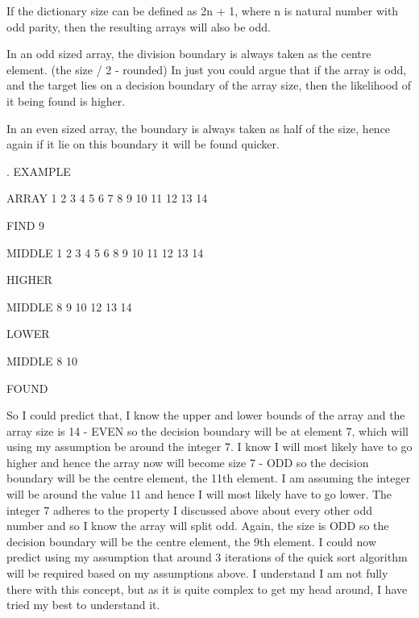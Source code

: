 \documentclass{article}
\begin{document}
If the dictionary size can be defined as 2n + 1, where n is natural number with odd parity, then the resulting arrays will also be odd.\par

In an odd sized array, the division boundary is always taken as the centre element. (the size / 2 - rounded) In just you could argue that if the array is odd, and the target lies on a decision boundary of the array size, then the likelihood of it being found is higher.\par

In an even sized array, the boundary is always taken as half of the size, hence again if it lie on this boundary it will be found quicker.\par

.\newline
EXAMPLE\newline


ARRAY  1 2 3 4 5 6 7 8 9 10 11 12 13 14\newline

FIND   9\newline

MIDDLE 1 2 3 4 5 6   8 9 10 11 12 13 14\newline

HIGHER\newline

MIDDLE               8 9 10    12 13 14\newline

LOWER\newline

MIDDLE               8   10\newline

FOUND\newline


So I could predict that, I know the upper and lower bounds of the array and the array size is 14 - EVEN so the decision boundary will be at element 7, which will using my assumption be around the integer 7.
I know I will most likely have to go higher and hence the array now will become size 7 - ODD so the decision boundary will be the centre element, the 11th element. I am assuming the integer will be around the value 11 and hence I will most likely have to go lower. The integer 7 adheres to the property I discussed above about every other odd number and so I know the array will split odd. Again, the size is ODD so the decision boundary will be the centre element, the 9th element. I could now predict using my assumption that around 3 iterations of the quick sort algorithm will be required based on my assumptions above. I understand I am not fully there with this concept, but as it is quite complex to get my head around, I have tried my best to understand it.\par
\end{document}
